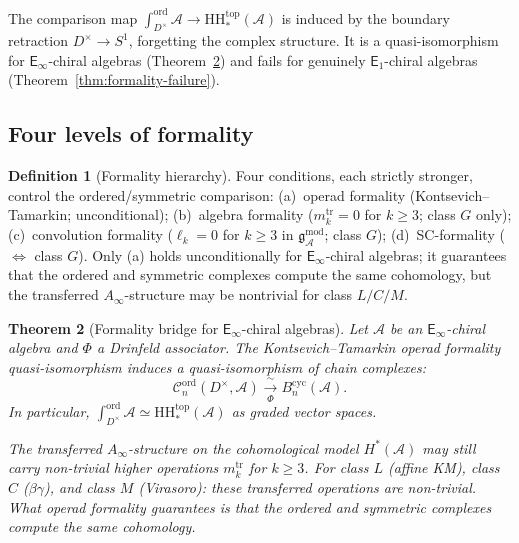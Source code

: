 \documentclass[11pt,reqno]{amsart}
\newtheorem{theorem}{Theorem}[section]
\theoremstyle{definition}
\newtheorem{definition}[theorem]{Definition}
\theoremstyle{remark}
\newcommand{\cA}{\mathcal{A}}
\newcommand{\cC}{\mathcal{C}}
\newcommand{\HH}{\mathrm{HH}}
\newcommand{\Ainf}{A_{\infty}}
\newcommand{\Eone}{\mathsf{E}_{1}}
\newcommand{\Einf}{\mathsf{E}_{\infty}}
\newcommand{\gmod}{\mathfrak{g}^{\mathrm{mod}}_{\cA}}
\numberwithin{equation}{section}
\begin{document}
The comparison map
$\int_{D^\times}^{\mathrm{ord}} \cA \to
\HH^{\mathrm{top}}_*(\cA)$ is induced by the boundary
retraction $D^\times \to S^1$, forgetting the complex
structure. It is a quasi-isomorphism for $\Einf$-chiral
algebras
(Theorem~\ref{thm:formality-bridge}) and fails for
genuinely $\Eone$-chiral algebras
(Theorem~\ref{thm:formality-failure}).

\subsection{Four levels of formality}
\label{subsec:formality}

\begin{definition}[Formality hierarchy]
\label{def:formality-hierarchy}
Four conditions, each strictly stronger, control the
ordered/symmetric comparison:
\textup{(a)}~operad formality
(Kontsevich--Tamarkin; unconditional);
\textup{(b)}~algebra formality
($m_k^{\mathrm{tr}} = 0$ for $k \geq 3$; class $G$ only);
\textup{(c)}~convolution formality
($\ell_k = 0$ for $k \geq 3$ in $\gmod$; class $G$);
\textup{(d)}~SC-formality ($\Leftrightarrow$ class $G$).
Only \textup{(a)} holds unconditionally for $\Einf$-chiral
algebras; it guarantees that the ordered and symmetric
complexes compute the same cohomology, but the transferred
$\Ainf$-structure may be nontrivial for class $L/C/M$.
\end{definition}

\begin{theorem}[Formality bridge for $\Einf$-chiral algebras]
\label{thm:formality-bridge}
Let $\cA$ be an $\Einf$-chiral algebra and $\Phi$ a
Drinfeld associator. The Kontsevich--Tamarkin operad
formality quasi-isomorphism induces a quasi-isomorphism
of chain complexes:
\begin{equation}\label{eq:formality-bridge}
  \cC_n^{\mathrm{ord}}(D^\times, \cA)
  \xrightarrow[\Phi]{\;\sim\;}
  B^{\mathrm{cyc}}_n(\cA).
\end{equation}
In particular,
$\int_{D^\times}^{\mathrm{ord}} \cA
\simeq \HH^{\mathrm{top}}_*(\cA)$
as graded vector spaces.

The transferred $\Ainf$-structure on the cohomological
model $H^*(\cA)$ may still carry non-trivial higher
operations $m_k^{\mathrm{tr}}$ for $k \geq 3$. For
class $L$ \textup{(}affine KM\textup{)}, class $C$
\textup{(}$\beta\gamma$\textup{)}, and class $M$
\textup{(}Virasoro\textup{)}: these transferred
operations are non-trivial. What operad formality
guarantees is that the ordered and symmetric complexes
compute the same cohomology.
\end{theorem}
\end{document}
